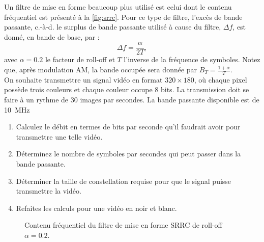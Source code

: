 \documentclass [a4paper, 11pt] {article}
\begin{document}
    \begin{exercice}{4}
        
        Un filtre de mise en forme beaucoup plus utilisé est celui dont le contenu fréquentiel est présenté à la \autoref{fig:srrc}. Pour ce type de filtre, l'excès de bande passante, c.-à-d. le surplus de bande passante utilisé à cause du filtre, $\Delta f$, est donné, en bande de base, par :
        \begin{equation}
            \Delta f = \frac{\alpha}{2 T},
        \end{equation}
        avec $\alpha=0.2$ le facteur de roll-off et $T$ l'inverse de la fréquence de symboles. Notez que, après modulation AM, la bande occupée sera donnée par $B_T=\frac{1+\alpha}{T}$.\\
        
        On souhaite transmettre un signal vidéo en format $320\times180$, où chaque pixel possède trois couleurs et chaque couleur occupe 8 bits. La transmission doit se faire à un rythme de 30 images par secondes. La bande passante disponible est de \SI{10}{\mega\hertz}
        
        \begin{enumerate}
            \item Calculez le débit en termes de bits par seconde qu'il faudrait avoir pour transmettre une telle vidéo.
            \item Déterminez le nombre de symboles par secondes qui peut passer dans la bande passante.
            \item Déterminer la taille de constellation requise pour que le signal puisse transmettre la vidéo.
            \item Refaites les calculs pour une vidéo en noir et blanc.
        \end{enumerate}
        
        \begin{figure}[H]
            \centering
            \caption{Contenu fréquentiel du filtre de mise en forme SRRC de roll-off $\alpha=0.2$.}
            \label{fig:srrc}
        \end{figure}
        
    \end{exercice}
\end{document}
